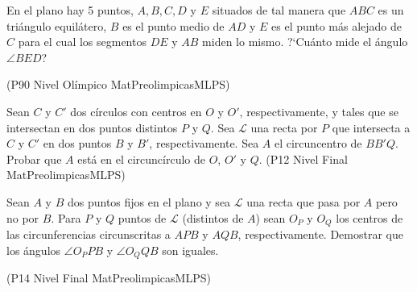 \newpage


\begin{problema}
En el plano hay 5 puntos, $A, B, C, D$ y $E$ situados de tal manera que $ABC$ es
un tri\'angulo equil\'atero, $B$ es el punto medio de $AD$ y $E$ es el punto m\'as alejado
de $C$ para el cual los segmentos $DE$ y $AB$ miden lo mismo. ?`Cu\'anto mide el \'angulo
$\angle BED$?


(P90 Nivel Ol\'impico MatPreolimpicasMLPS)
\end{problema}

\begin{problema}
Sean $C$ y $C'$ dos c\'irculos con centros en $O$ y $O'$, respectivamente,
y tales que se intersectan en dos puntos distintos $P$ y $Q$. Sea $\mathcal{L}$
una recta por $P$ que intersecta a $C$ y $C'$ en dos puntos $B$ y $B'$, respectivamente.
Sea $A$ el circuncentro de $BB'Q$. Probar que $A$ est\'a en el circunc\'irculo de $O$,
$O'$ y $Q$.
(P12 Nivel Final MatPreolimpicasMLPS)


\end{problema}

\begin{problema}
Sean $A$ y $B$ dos puntos fijos en el plano y sea $\mathcal{L}$ una recta que
pasa por $A$ pero no por $B$. Para $P$ y $Q$ puntos de $\mathcal{L}$ (distintos de $A$)
sean $O_P$ y $O_Q$ los centros de las circunferencias circunscritas a $APB$ y $AQB$,
respectivamente. Demostrar que los \'angulos $\angle O_P PB$ y $\angle O_Q QB$ son
iguales.


(P14 Nivel Final MatPreolimpicasMLPS)

\end{problema}


